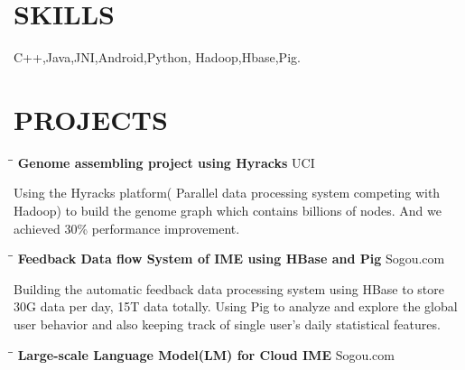 \documentclass{res}
\begin{document}
\begin{resume}
\section{SKILLS}          
    C++,Java,JNI,Android,Python, Hadoop,Hbase,Pig.
 
\section{PROJECTS}
   \vspace{-0.1in}	
   \begin{tabbing}
   \hspace{2.5in}\= \hspace{3in}\= \kill %
    {\bf Genome assembling project using Hyracks }\> \>UCI     \\
   \end{tabbing}\vspace{-30pt}      %
   Using the Hyracks platform( Parallel data processing system competing with Hadoop) to build the genome graph which contains billions of nodes. And we achieved 30\% performance improvement.
%
   \vspace{-0.1in}	
   \begin{tabbing}
   \hspace{2.5in}\= \hspace{3in}\= \kill %
    {\bf Feedback Data flow System of IME using HBase and Pig}\> \>Sogou.com     \\
   \end{tabbing}\vspace{-30pt}      %
   Building the automatic feedback data processing system using HBase to store 30G data per day, 15T data totally. Using Pig to analyze and explore the global user behavior and also keeping track of single user's daily statistical features. 
   \vspace{-0.1in}	
   \begin{tabbing}
   \hspace{2.5in}\= \hspace{3in}\= \kill %
    {\bf Large-scale Language Model(LM) for Cloud IME} \> \>Sogou.com     \\
   \end{tabbing}\vspace{-30pt}      %

\end{resume}
\end{document}
